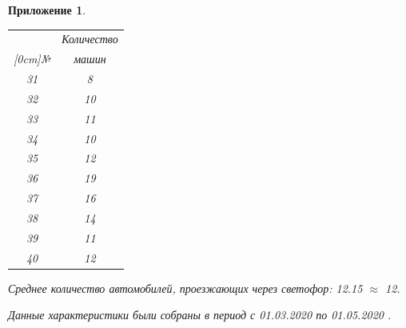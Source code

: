 \documentclass[12pt, a4paper]{extarticle}
\numberwithin{equation}{section}
\newtheorem{attachment}{\hspace{12cm}  Приложение}
\numberwithin{figure}{section}
\begin{document}
\begin{attachment}
\begin{table}[h!]
\begin{minipage}{0.23\linewidth}
		\begin{tabular}{|c|c|}
			\hline
			& Количество \\ 
			\raisebox{1.5ex}[0cm]{№}
			& машин 
			\\\hline
			31 & 8
			\\\hline
			32 & 10
			\\\hline
			33 & 11
			\\\hline
			34 & 10
			\\\hline
			35 & 12
			\\\hline
			36 & 19
			\\\hline
			37 & 16
			\\\hline
			38 & 14
			\\\hline
			39 & 11
			\\\hline
			40 & 12
			\\\hline
		\end{tabular}
	\end{minipage}
\end{table}
\noindent Среднее количество автомобилей, проезжающих через светофор: 12.15 $\approx$ 12.
\newline

\noindent\textup{Данные характеристики были собраны в период с 01.03.2020 по 01.05.2020 }.
\end{attachment}
\end{document}
